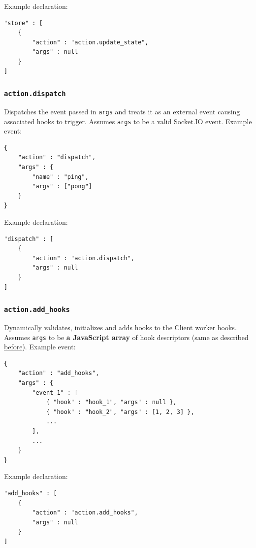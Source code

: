 \documentclass[a4paper]{article}
\begin{document}
\noindent
Example declaration:

\begin{verbatim}
"store" : [
    {
        "action" : "action.update_state",
        "args" : null
    }
]
\end{verbatim}
\subsubsection{\texttt{action.dispatch}}
\label{sec-8-3-5}

Dispatches the event passed in \texttt{args} and treats it as an external event causing associated hooks to trigger. Assumes \texttt{args} to be a valid Socket.IO event. Example event:

\begin{verbatim}
{
    "action" : "dispatch",
    "args" : {
        "name" : "ping",
        "args" : ["pong"]
    }
}
\end{verbatim}




\noindent
Example declaration:

\begin{verbatim}
"dispatch" : [
    {
        "action" : "action.dispatch",
        "args" : null
    }
]
\end{verbatim}
\subsubsection{\texttt{action.add\_hooks}}
\label{sec-8-3-6}

Dynamically validates, initializes and adds hooks to the Client worker hooks. Assumes \texttt{args} to be \textbf{a JavaScript array} of hook descriptors (same as described \hyperref[ref-hooks_config]{before}). Example event:

\begin{verbatim}
{
    "action" : "add_hooks",
    "args" : {
        "event_1" : [
            { "hook" : "hook_1", "args" : null },
            { "hook" : "hook_2", "args" : [1, 2, 3] },
            ...
        ],
        ...
    }
}
\end{verbatim}




\noindent
Example declaration:

\begin{verbatim}
"add_hooks" : [
    {
        "action" : "action.add_hooks",
        "args" : null
    }
]
\end{verbatim}
\end{document}
